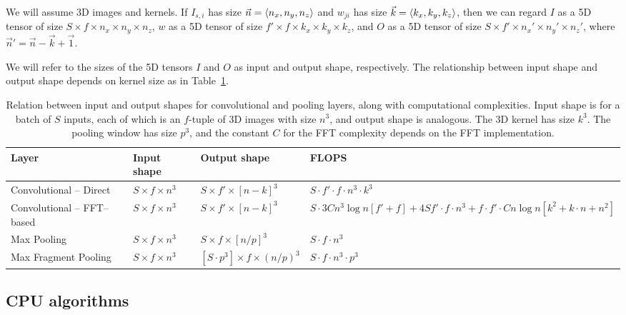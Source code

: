 \documentclass[conference]{./IEEEtran/IEEEtran}
\DeclarePairedDelimiter{\angled}{\langle}{\rangle}
\begin{document}
  We will assume 3D images and kernels.  If $I_{s,i}$ has size
  $\vec{n} = \angled{n_x, n_y, n_z}$ and $w_{ji}$ has size $\vec{k} =
  \angled{k_x,k_y,k_z}$, then we can regard $I$ as a 5D tensor of size
  $S \times f \times n_x \times n_y \times n_z$, $w$ as a 5D tensor of
  size $f' \times f \times k_x \times k_y \times k_z$, and $O$ as a 5D
  tensor of size $S \times f' \times n_x' \times n_y' \times n_z'$,
  where $\vec{n}' = \vec{n} - \vec{k} + \vec{1}$.

  We will refer to the sizes of the 5D tensors $I$ and $O$ as input
  and output shape, respectively.  The relationship between input
  shape and output shape depends on kernel size as in
  Table~\ref{table:layers_complexity}.

  \begin{table}[t]
    {\footnotesize
    \centering
    \begin{tabular}{l|lll}
      \toprule
      Layer   & Input shape    & Output shape     & FLOPS \\
      \midrule
      Convolutional -- Direct &
      $S \times f \times n^3$ &
      $S \times f' \times [n-k]^3$ &
      $S \cdot f' \cdot f \cdot n^3 \cdot k^3$ \\
      Convolutional -- FFT--based &
      $S \times f \times n^3$ &
      $S \times f' \times [n-k]^3$ &
      $S \cdot 3Cn^3 \log n[f' + f] + 4Sf' \cdot f \cdot n^3 + f \cdot f' \cdot Cn \log n[k^2 + k \cdot n + n^2]$ \\
      Max Pooling &
      $S \times f \times n^3$ &
      $S \times f \times [n/p]^3$ &
      $S \cdot f \cdot n^3$ \\
      Max Fragment Pooling &
      $S \times f \times n^3$ &
      $[S \cdot p^3] \times f \times (n/p)^3$ &
      $S \cdot f \cdot n^3 \cdot p^3$ \\
      \bottomrule
    \end{tabular}
    \caption{Relation between input and output shapes for
      convolutional and pooling layers, along with computational
      complexities. Input shape is for a batch of $S$ inputs, each of
      which is an $f$-tuple of 3D images with size $n^3$, and output
      shape is analogous. The 3D kernel has size $k^3$. The pooling
      window has size $p^3$, and the constant $C$ for the FFT
      complexity depends on the FFT implementation.}
    \label{table:layers_complexity}
    }
  \end{table}


\subsection{CPU algorithms}
\end{document}
